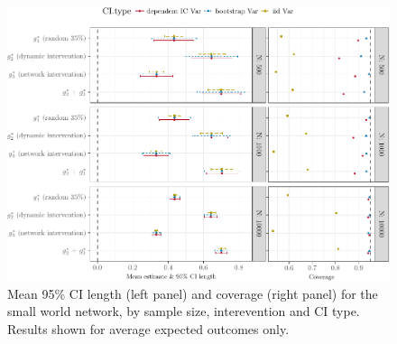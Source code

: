 \documentclass[english]{article}\usepackage[]{graphicx}\usepackage[]{color}
\makeatletter
\def\maxwidth{ %
  \ifdim\Gin@nat@width>\linewidth
    \linewidth
  \else
    \Gin@nat@width
  \fi
}
\newenvironment{knitrout}{}{} %
\theoremstyle{plain}
\theoremstyle{plain}
\makeatother
\begin{document}
\begin{knitrout}\footnotesize
{}\color{fgcolor}\begin{figure}

{\centering \includegraphics[width=\maxwidth]{TablesFigs/knitR-CIres_EY_smwld-1} 

}

\caption[Mean 95\% CI length (left panel) and coverage (right panel) for the small world network, by sample size, interevention and CI type]{Mean 95\% CI length (left panel) and coverage (right panel) for the small world network, by sample size, interevention and CI type. Results shown for average expected outcomes only.}\label{fig:CIres.EY.smwld}
\end{figure}


\end{knitrout}
\end{document}

